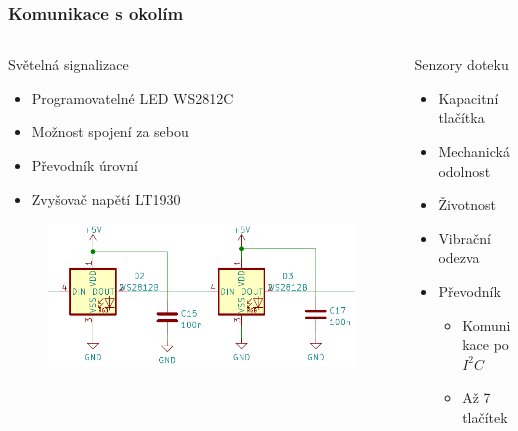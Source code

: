 \documentclass[%
  12pt,       				%
	t,                  %
	aspectratio=1610,   %
	unicode,						%
]{beamer}				    	%
\begin{document}
\begin{frame} 
	\frametitle{Komunikace s okolím}
	
	\begin{columns}[T] 								%
		\begin{column}{0.5\textwidth}		%
			Světelná signalizace
			\begin{itemize}
				\item Programovatelné LED WS2812C
				\item Možnost spojení za sebou
				\item Převodník úrovní
				\item Zvyšovač napětí LT1930
			\end{itemize}
			\begin{figure}%
				\centering	          
				\includegraphics[width=1\columnwidth]{obrazky/WS2812C_prezentace.png}
			\end{figure}
		\end{column}
		\begin{column}{0.5\textwidth}		%
			Senzory doteku
			\begin{itemize}
				\item Kapacitní tlačítka
				\item Mechanická odolnost
				\item Životnost
				\item Vibrační odezva
				\item Převodník
				\begin{itemize}
					\item Komunikace po  $I^2C$
					\item Až 7 tlačítek
				\end{itemize}
			\end{itemize}
		\end{column}
	\end{columns}											%
\end{frame}
\end{document}
